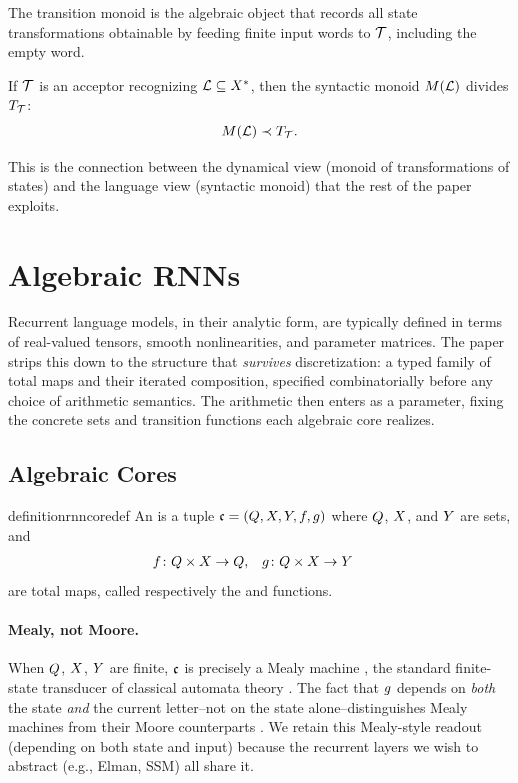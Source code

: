 \documentclass{article}
\begin{document}
The transition monoid is the algebraic object that records all state transformations obtainable by feeding finite input words to $\mathcal{T}$, including the empty word.

\begin{proposition}\label{prop:syntactic-divisibility}
If $\mathcal{T}$ is an acceptor recognizing $\mathcal{L} \subseteq X^*$, then the syntactic monoid $M(\mathcal{L})$ divides $T_{\mathcal{T}}$:
$$
M(\mathcal{L}) \prec T_{\mathcal{T}}.
$$
\end{proposition}

This is the connection between the dynamical view (monoid of transformations of states) and the language view (syntactic monoid) that the rest of the paper exploits.



\section{Algebraic RNNs}\label{sec:algebraic-rnns}

Recurrent language models, in their analytic form, are typically defined in terms of real-valued tensors, smooth nonlinearities, and parameter matrices. 
The paper strips this down to the structure that \emph{survives} discretization: a typed family of total maps and their iterated composition, specified combinatorially before any choice of arithmetic semantics. 
The arithmetic then enters as a parameter, fixing the concrete sets and transition functions each algebraic core realizes.

\subsection{Algebraic Cores}\label{sec:algebraic-cores}

\begin{restatable}{definition}{rnncoredef}\label{def:algebraic-core}
An  is a tuple $\mathfrak{c} = (Q, X, Y, f, g)$ where $Q$, $X$, and $Y$ are sets, and
\begin{align*}
f &\colon Q \times X \to Q, &
g &\colon Q \times X \to Y
\end{align*}
are total maps, called respectively the  and  functions.
\end{restatable}

\paragraph{Mealy, not Moore.}
When $Q$, $X$, $Y$ are finite, $\mathfrak{c}$ is precisely a Mealy machine \citep{mealy1955}, the standard finite-state transducer of classical automata theory \citep{eilenberg1976}. 
The fact that $g$ depends on \emph{both} the state \emph{and} the current letter--not on the state alone--distinguishes Mealy machines from their Moore counterparts \citep{moore1956}. 
We retain this Mealy-style readout (depending on both state and input) because the recurrent layers we wish to abstract (e.g., Elman, SSM) all share it. 
\end{document}
